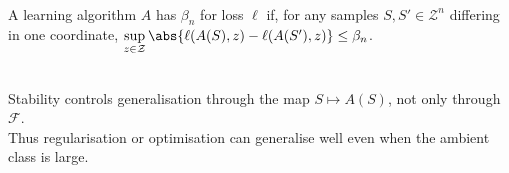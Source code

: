 \begin{definition} \label{def:sl-uniform-stability} \\
A learning algorithm $A$ has  $\beta_n$ for loss $\ell$ if, for any samples $S,S'\in\mathcal{Z}^n$ differing in one coordinate, $\sup\limits_{z\in\mathcal{Z}}\abs{\ell(A(S),z)-\ell(A(S'),z)}\leq\beta_n$.
\end{definition}

\begin{remark} \label{rem:sl-stability-generalization} \\
Stability controls generalisation through the map $S\mapsto A(S)$, not only through $\mathcal{F}$.\\
Thus regularisation or optimisation can generalise well even when the ambient class is large.
\end{remark}
